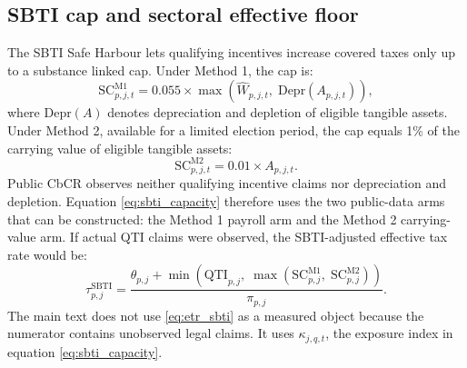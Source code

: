 \documentclass[11pt,a4paper]{article}
\begin{document}
\subsection{SBTI cap and sectoral effective floor}\label{app:sbti_details}

The SBTI Safe Harbour lets qualifying incentives increase covered taxes only up to a substance linked cap. Under Method 1, the cap is:
\begin{equation}\label{eq:substance_cap}
\text{SC}_{p,j,t}^{\text{M1}} = 0.055 \times \max\!\left(\hat{W}_{p,j,t},\; \text{Depr}(A_{p,j,t})\right),
\end{equation}
where $\text{Depr}(A)$ denotes depreciation and depletion of eligible tangible assets. Under Method 2, available for a limited election period, the cap equals 1\% of the carrying value of eligible tangible assets:
\begin{equation}\label{eq:substance_cap_m2}
\text{SC}_{p,j,t}^{\text{M2}} = 0.01 \times A_{p,j,t}.
\end{equation}
Public CbCR observes neither qualifying incentive claims nor depreciation and depletion. Equation \eqref{eq:sbti_capacity} therefore uses the two public-data arms that can be constructed: the Method 1 payroll arm and the Method 2 carrying-value arm. If actual QTI claims were observed, the SBTI-adjusted effective tax rate would be:
\begin{equation}\label{eq:etr_sbti}
\tau_{p,j}^{\text{SBTI}} = \frac{\theta_{p,j} + \min\!\left(\text{QTI}_{p,j},\; \max\!\left(\text{SC}_{p,j}^{\text{M1}},\; \text{SC}_{p,j}^{\text{M2}}\right)\right)}{\pi_{p,j}}.
\end{equation}
The main text does not use \eqref{eq:etr_sbti} as a measured object because the numerator contains unobserved legal claims. It uses $\kappa_{j,q,t}$, the exposure index in equation \eqref{eq:sbti_capacity}.
\end{document}
